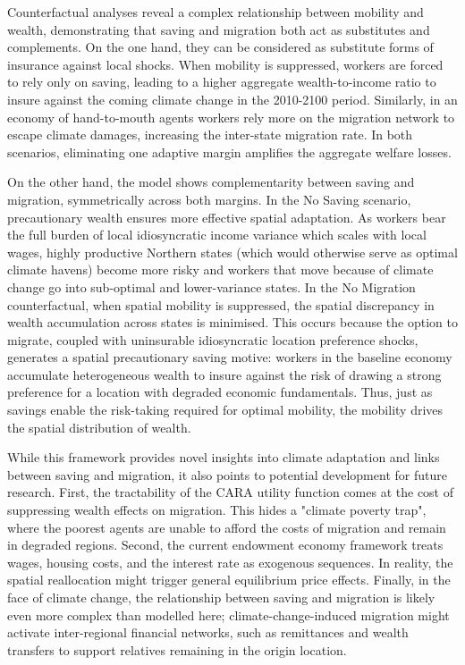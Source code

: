 \documentclass[12pt, a4paper]{article}
\begin{document}
Counterfactual analyses reveal a complex relationship between mobility and wealth, demonstrating that saving and migration both act as substitutes and complements. On the one hand, they can be considered as substitute forms of insurance against local shocks. When mobility is suppressed, workers are forced to rely only on saving, leading to a higher aggregate wealth-to-income ratio to insure against the coming climate change in the 2010-2100 period. Similarly, in an economy of hand-to-mouth agents workers rely more on the migration network to escape climate damages, increasing the inter-state migration rate. In both scenarios, eliminating one adaptive margin amplifies the aggregate welfare losses.

On the other hand, the model shows complementarity between saving and migration, symmetrically across both margins. In the No Saving scenario, precautionary wealth ensures more effective spatial adaptation. As workers bear the full burden of local idiosyncratic income variance which scales with local wages, highly productive Northern states (which would otherwise serve as optimal climate havens) become more risky and workers that move because of climate change go into sub-optimal and lower-variance states. In the No Migration counterfactual, when spatial mobility is suppressed, the spatial discrepancy in wealth accumulation across states is minimised. This occurs because the option to migrate, coupled with uninsurable idiosyncratic location preference shocks, generates a spatial precautionary saving motive: workers in the baseline economy accumulate heterogeneous wealth to insure against the risk of drawing a strong preference for a location with degraded economic fundamentals. Thus, just as savings enable the risk-taking required for optimal mobility, the mobility drives the spatial distribution of wealth.

While this framework provides novel insights into climate adaptation and links between saving and migration, it also points to potential development for future research. First, the tractability of the CARA utility function comes at the cost of suppressing wealth effects on migration. This hides a "climate poverty trap", where the poorest agents are unable to afford the costs of migration and remain in degraded regions. Second, the current endowment economy framework treats wages, housing costs, and the interest rate as exogenous sequences. In reality, the spatial reallocation might trigger general equilibrium price effects. Finally, in the face of climate change, the relationship between saving and migration is likely even more complex than modelled here; climate-change-induced migration might activate inter-regional financial networks, such as remittances and wealth transfers to support relatives remaining in the origin location.
\end{document}
